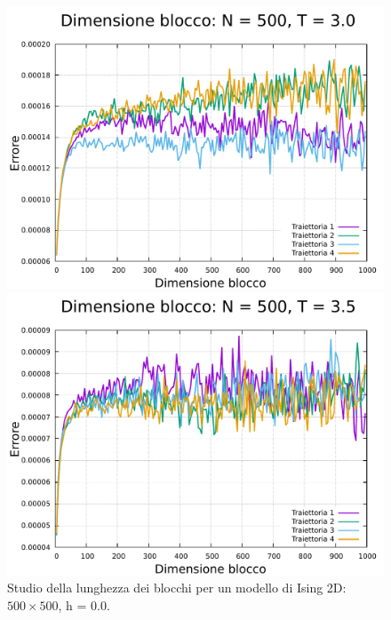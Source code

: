 \begin{figure}[H]
    \begin{minipage}{0.45\textwidth}  
      \centering
      \includegraphics[page=1, width=\textwidth]{Immagini/simIsing2D/metro/lblk/err_500_3.0.pdf}
      \caption{$T\,=\,3.0$}
    \end{minipage}\hfill
    \begin{minipage}{0.45\textwidth}  
      \centering
      \includegraphics[page=1, width=\textwidth]{Immagini/simIsing2D/metro/lblk/err_500_3.5.pdf}
      \caption{$T\,=\,3.5$}
    \end{minipage}
    \caption{Studio della lunghezza dei blocchi per un modello di Ising 2D: $500 \times 500$, h = 0.0.}
\end{figure}

